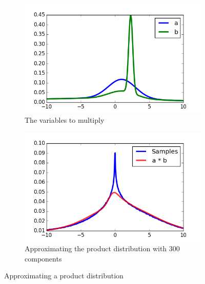 \documentclass[11pt,a4paper]{book}
\begin{document}
\begin{figure}[h]
  \centering
  \begin{subfigure}[t]{0.45\textwidth}
    \centering
    \includegraphics[width=\textwidth]{thesis/operations/product-hermite-vars}
    \caption{The variables to multiply}
    \label{fig:product-hermite-vars}
  \end{subfigure}
  \hfill
  \begin{subfigure}[t]{0.45\textwidth}
    \centering
    \includegraphics[width=\textwidth]{thesis/operations/product-hermite-50-components}
    \caption{Approximating the product distribution with $300$ components}
  \end{subfigure}
  \caption{Approximating a product distribution}
  \label{fig:product-hermite}
\end{figure}
\end{document}
